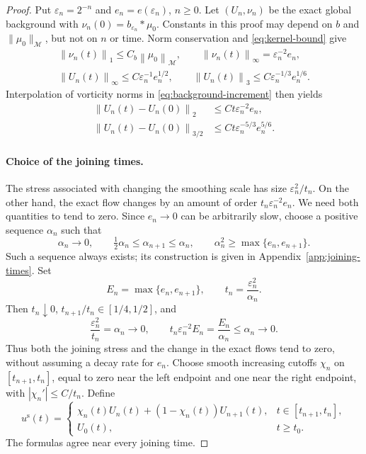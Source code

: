 \documentclass[11pt,a4paper,reqno]{amsart}
\theoremstyle{plain}
\theoremstyle{definition}
\theoremstyle{remark}
\numberwithin{equation}{section}
\newcommand{\M}{\mathcal M}
\newcommand{\norm}[2]{\left\|#1\right\|_{#2}}
\begin{document}
\begin{proof}
Put $\varepsilon_n=2^{-n}$ and $e_n=e(\varepsilon_n)$, $n\ge0$.
Let $(U_n,\nu_n)$ be the exact global background with
$\nu_n(0)=b_{\varepsilon_n}*\mu_0$. Constants in this proof may depend
on $b$ and $\|\mu_0\|_{\M}$, but not on $n$ or time.
Norm conservation and \eqref{eq:kernel-bound} give
\begin{equation}\label{eq:seed-background-sizes}
 \begin{gathered}
 \norm{\nu_n(t)}1\le C_b\norm{\mu_0}\M,
 \qquad\norm{\nu_n(t)}\infty=\varepsilon_n^{-2}e_n,\\
 \norm{U_n(t)}\infty\le C\varepsilon_n^{-1}e_n^{1/2},
 \qquad\norm{U_n(t)}3\le C\varepsilon_n^{-1/3}e_n^{1/6}.
 \end{gathered}
\end{equation}
Interpolation of vorticity norms in
\eqref{eq:background-increment} then yields
\begin{equation}\label{eq:seed-increments}
 \begin{aligned}
 \norm{U_n(t)-U_n(0)}2&\le Ct\varepsilon_n^{-2}e_n,\\
 \norm{U_n(t)-U_n(0)}{3/2}
     &\le Ct\varepsilon_n^{-5/3}e_n^{5/6}.
 \end{aligned}
\end{equation}

\paragraph{Choice of the joining times.}
The stress associated with changing the smoothing scale has size
$\varepsilon_n^2/t_n$. On the other hand, the exact flow changes
by an amount of order $t_n\varepsilon_n^{-2}e_n$. We need both
quantities to tend to zero. Since $e_n\to0$ can be arbitrarily
slow, choose a positive sequence $\alpha_n$ such that
\[
 \alpha_n\longrightarrow0,\qquad
 \tfrac12\alpha_n\le\alpha_{n+1}\le\alpha_n,\qquad
 \alpha_n^2\ge\max\{e_n,e_{n+1}\}.
\]
Such a sequence always exists; its construction is given in
Appendix~\ref{app:joining-times}. Set
\[
 E_n=\max\{e_n,e_{n+1}\},\qquad
 t_n=\frac{\varepsilon_n^2}{\alpha_n}.
\]
Then $t_n\downarrow0$, $t_{n+1}/t_n\in[1/4,1/2]$, and
\begin{equation}\label{eq:joining-balance}
 \frac{\varepsilon_n^2}{t_n}=\alpha_n\longrightarrow0,
 \qquad
 t_n\varepsilon_n^{-2}E_n=\frac{E_n}{\alpha_n}
                          \le\alpha_n\longrightarrow0.
\end{equation}
Thus both the joining stress and the change in the exact flows tend
to zero, without assuming a decay rate for $e_n$.
Choose smooth increasing cutoffs $\chi_n$ on $[t_{n+1},t_n]$, equal
to zero near the left endpoint and one near the right endpoint, with
$|\chi_n'|\le C/t_n$. Define
\begin{equation}\label{eq:seed-velocity}
 u^{\mathrm s}(t)=
 \begin{cases}
 \chi_n(t)U_n(t)+(1-\chi_n(t))U_{n+1}(t),
                       &t\in[t_{n+1},t_n],\\
 U_0(t),               &t\ge t_0.
 \end{cases}
\end{equation}
The formulas agree near every joining time.


\end{proof}
\end{document}
